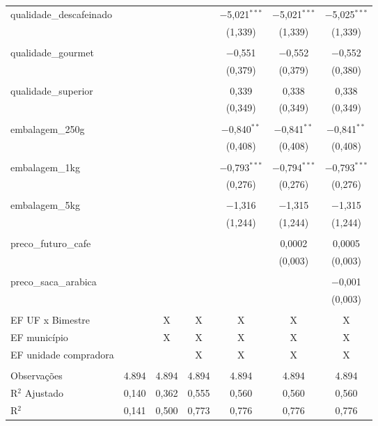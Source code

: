 \begin{table}[!htbp]
\begin{threeparttable}
\begin{tabular}{lcccccc}
 qualidade\_descafeinado &  &  &  & $-$5,021$^{***}$ & $-$5,021$^{***}$ & $-$5,025$^{***}$ \\ 
  &  &  &  & (1,339) & (1,339) & (1,339) \\ 
  & & & & & & \\ 
 qualidade\_gourmet &  &  &  & $-$0,551 & $-$0,552 & $-$0,552 \\ 
  &  &  &  & (0,379) & (0,379) & (0,380) \\ 
  & & & & & & \\ 
 qualidade\_superior &  &  &  & 0,339 & 0,338 & 0,338 \\ 
  &  &  &  & (0,349) & (0,349) & (0,349) \\ 
  & & & & & & \\ 
 embalagem\_250g &  &  &  & $-$0,840$^{**}$ & $-$0,841$^{**}$ & $-$0,841$^{**}$ \\ 
  &  &  &  & (0,408) & (0,408) & (0,408) \\ 
  & & & & & & \\ 
 embalagem\_1kg &  &  &  & $-$0,793$^{***}$ & $-$0,794$^{***}$ & $-$0,793$^{***}$ \\ 
  &  &  &  & (0,276) & (0,276) & (0,276) \\ 
  & & & & & & \\ 
 embalagem\_5kg &  &  &  & $-$1,316 & $-$1,315 & $-$1,315 \\ 
  &  &  &  & (1,244) & (1,244) & (1,244) \\ 
  & & & & & & \\ 
 preco\_futuro\_cafe &  &  &  &  & 0,0002 & 0,0005 \\ 
  &  &  &  &  & (0,003) & (0,003) \\ 
  & & & & & & \\ 
 preco\_saca\_arabica &  &  &  &  &  & $-$0,001 \\ 
  &  &  &  &  &  & (0,003) \\ 
  & & & & & & \\ 

 EF UF x Bimestre  &  & X & X & X & X & X \\ 
 EF município  &  & X & X & X & X & X \\ 
 EF unidade compradora  &  &  & X & X & X & X \\ 
\hline \\[-1.8ex] 

Observações & 4.894 & 4.894 & 4.894 & 4.894 & 4.894 & 4.894 \\ 
R$^{2}$ Ajustado & 0,140 & 0,362 & 0,555 & 0,560 & 0,560 & 0,560 \\ 
R$^{2}$ & 0,141 & 0,500 & 0,773 & 0,776 & 0,776 & 0,776 \\ 
\hline 


\end{tabular}
\end{threeparttable}
\end{table}
